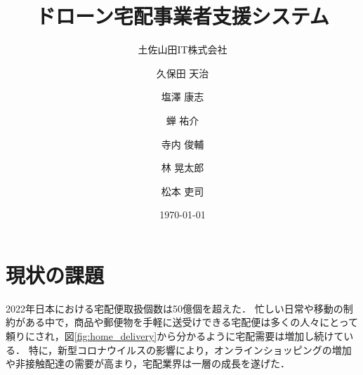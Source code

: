 \documentclass[a4paper, titlepage]{jsarticle}
\date{\today}
\title{ドローン宅配事業者支援システム}
\author{土佐山田IT株式会社 \and
        久保田 天治 \and 塩澤 康志 \and 蝉 祐介 \and 寺内 俊輔 \and 林 晃太郎 \and 松本 吏司}
\begin{document}
\maketitle

\tableofcontents

\clearpage

\section{現状の課題}
2022年日本における宅配便取扱個数は50億個を超えた．
忙しい日常や移動の制約がある中で，商品や郵便物を手軽に送受けできる宅配便は多くの人々にとって頼りにされ，図\ref{fig:home_delivery}から分かるように宅配需要は増加し続けている．
特に，新型コロナウイルスの影響により，オンラインショッピングの増加や非接触配達の需要が高まり，宅配業界は一層の成長を遂げた．
\end{document}
